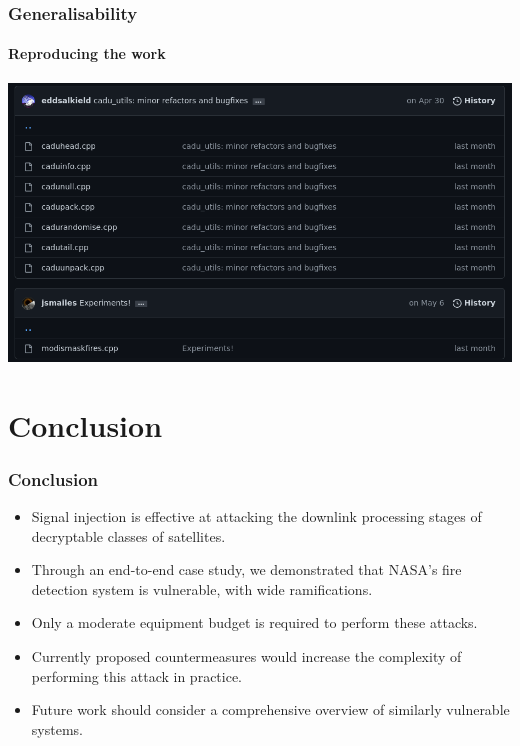 \documentclass{beamer}
\begin{document}
\begin{frame}
  \frametitle{Generalisability}
  \framesubtitle{Reproducing the work}
  \includegraphics[width=\textwidth]{images/code_tools.png}
\end{frame}

\section{Conclusion}

\begin{frame}
  \frametitle{Conclusion}
  \begin{itemize}
    \item Signal injection is effective at attacking the downlink processing stages of decryptable classes of satellites.
    \item Through an end-to-end case study, we demonstrated that NASA's fire detection system is vulnerable, with wide ramifications.
    \item Only a moderate equipment budget is required to perform these attacks.
    \item Currently proposed countermeasures would increase the complexity of performing this attack in practice.
    \item Future work should consider a comprehensive overview of similarly vulnerable systems.
  \end{itemize}
\end{frame}

\end{document}
